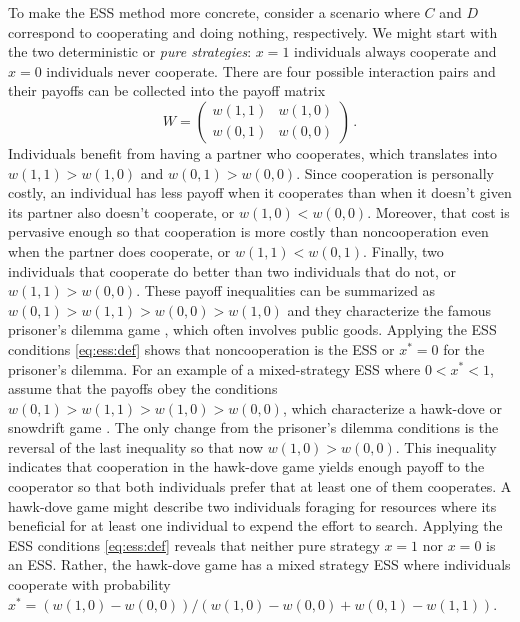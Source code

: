 \documentclass[11pt]{article}
\newcommand{\w}{w}
\newcommand{\ess}[1]{#1^*}
\begin{document}
To make the ESS method more concrete, consider a scenario where $C$ and $D$ correspond to cooperating and doing nothing, respectively. We might start with the two deterministic or \textit{pure strategies}: $x=1$ individuals always cooperate and $x=0$ individuals never cooperate. There are four possible interaction pairs and their payoffs can be collected into the payoff matrix
\begin{equation}
  \label{eq:payoff:matrix}
  W =
  \begin{pmatrix}
    \w(1,1) & \w(1,0) \\
    \w(0,1) & \w(0,0)
  \end{pmatrix} \, .
\end{equation}
Individuals benefit from having a partner who cooperates, which translates into $\w(1,1) > \w(1,0)$ and $\w(0,1) > \w(0,0)$. Since cooperation is personally costly, an individual has less payoff when it cooperates than when it doesn't given its partner also doesn't cooperate, or $\w(1,0) < \w(0,0)$. Moreover, that cost is pervasive enough so that cooperation is more costly than noncooperation even when the partner does cooperate, or $\w(1,1) < \w(0,1)$. Finally, two individuals that cooperate do better than two individuals that do not, or $\w(1,1) > \w(0,0)$. These payoff inequalities can be summarized as $\w(0,1) > \w(1,1) > \w(0,0) > \w(1,0)$ and they characterize the famous prisoner's dilemma game \cite{Rapoport:Chammah:1965}, which often involves public goods. Applying the ESS conditions \eqref{eq:ess:def} shows that noncooperation is the ESS or $\ess{x}=0$ for the prisoner's dilemma. For an example of a mixed-strategy ESS where $0 < \ess{x} < 1$, assume that the payoffs obey the conditions $\w(0,1) > \w(1,1) > \w(1,0) > \w(0,0)$, which characterize a hawk-dove \cite{Maynard-Smith:Price:1973,Maynard-Smith:Parker:1976} or snowdrift game \cite{Sugden:1986}. The only change from the prisoner's dilemma conditions is the reversal of the last inequality so that now $\w(1,0) > \w(0,0)$. This inequality indicates that cooperation in the hawk-dove game yields enough payoff to the cooperator so that both individuals prefer that at least one of them cooperates. A hawk-dove game might describe two individuals foraging for resources where its beneficial for at least one individual to expend the effort to search. Applying the ESS conditions \eqref{eq:ess:def} reveals that neither pure strategy $x=1$ nor $x=0$ is an ESS. Rather, the hawk-dove game has a mixed strategy ESS where individuals cooperate with probability $\ess{x} = (\w(1,0) - \w(0,0))/(\w(1,0) - \w(0,0) + w(0,1) - \w(1,1))$.
\end{document}
